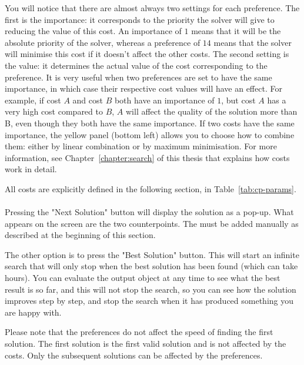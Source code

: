 You will notice that there are almost always two settings for each preference. The first is the importance: it corresponds to the priority the solver will give to reducing the value of this cost. An importance of $1$ means that it will be the absolute priority of the solver, whereas a preference of $14$ means that the solver will minimise this cost if it doesn't affect the other costs. The second setting is the value: it determines the actual value of the cost corresponding to the preference. It is very useful when two preferences are set to have the same importance, in which case their respective cost values will have an effect. For example, if cost $A$ and cost $B$ both have an importance of $1$, but cost $A$ has a very high cost compared to $B$, $A$ will affect the quality of the solution more than B, even though they both have the same importance. If two costs have the same importance, the yellow panel (bottom left) allows you to choose how to combine them: either by linear combination or by maximum minimisation. For more information, see Chapter~\ref{chapter:search} of this thesis that explains how costs work in detail.

All costs are explicitly defined in the following section, in Table~\ref{tab:cp-params}.

\paragraph{}
Pressing the "Next Solution" button will display the solution as a pop-up. What appears on the screen are the two counterpoints. The \cfs must be added manually as described at the beginning of this section. 


The other option is to press the "Best Solution" button. This will start an infinite search that will only stop when the best solution has been found (which can take hours). You can evaluate the output object at any time to see what the best result is so far, and this will not stop the search, so you can see how the solution improves step by step, and stop the search when it has produced something you are happy with.


Please note that the preferences do not affect the speed of finding the first solution. The first solution is the first valid solution and is not affected by the costs. Only the subsequent solutions can be affected by the preferences.

